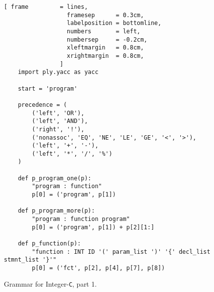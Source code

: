 \begin{figure}[!ht]
\centering
\begin{Verbatim}[ frame         = lines, 
                  framesep      = 0.3cm, 
                  labelposition = bottomline,
                  numbers       = left,
                  numbersep     = -0.2cm,
                  xleftmargin   = 0.8cm,
                  xrightmargin  = 0.8cm,
                ]
    import ply.yacc as yacc
    
    start = 'program'
    
    precedence = (
        ('left', 'OR'),
        ('left', 'AND'),
        ('right', '!'),
        ('nonassoc', 'EQ', 'NE', 'LE', 'GE', '<', '>'),
        ('left', '+', '-'),
        ('left', '*', '/', '%')
    )
    
    def p_program_one(p):
        "program : function"
        p[0] = ('program', p[1])
        
    def p_program_more(p):
        "program : function program"
        p[0] = ('program', p[1]) + p[2][1:]
    
    def p_function(p):
        "function : INT ID '(' param_list ')' '{' decl_list stmnt_list '}'"
        p[0] = ('fct', p[2], p[4], p[7], p[8])
\end{Verbatim}
\vspace*{-0.3cm}
\caption{Grammar for Integer-\texttt{C}, part 1.}
\label{fig:Compiler.ipynb-1}
\end{figure}

